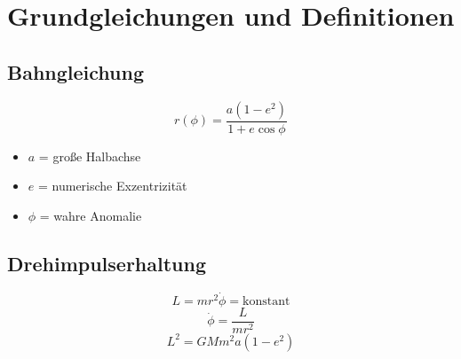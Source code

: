 \section{Grundgleichungen und Definitionen}
\subsection{Bahngleichung}
\[
r(\phi) = \frac{a(1 - e^2)}{1 + e \cos \phi}
\]
\begin{itemize}
    \item $a$ = große Halbachse
    \item $e$ = numerische Exzentrizität
    \item $\phi$ = wahre Anomalie
\end{itemize}

\subsection{Drehimpulserhaltung}
\[
L = m r^2 \dot{\phi} = \text{konstant}
\]
\[
\dot{\phi} = \frac{L}{m r^2}
\]
\[
L^2 = GM m^2 a (1 - e^2)
\]